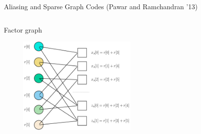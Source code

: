 \documentclass[10pt,xcolor=table]{beamer}
\begin{document}
\begin{frame}{Aliasing and Sparse Graph Codes (Pawar and Ramchandran '13)}
\begin{columns}
			\begin{block}{\small Factor graph}
				\begin{figure}[t]
					\centering
					\includegraphics[width=2.3in]{Factorgraph_example}
				\end{figure}
			\end{block}
		\end{columns}
	\end{frame}
	
	
	
\end{document}
